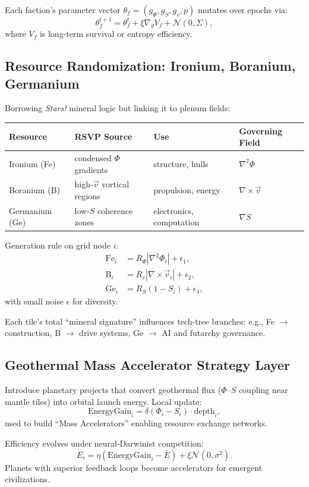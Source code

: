 \documentclass[12pt]{article}
\theoremstyle{definition}
\begin{document}
Each faction’s parameter vector $\theta_f = (g_\Phi, g_S, g_v, p)$ mutates over epochs via:
\[
\theta_f^{t+1} = \theta_f^t + \xi \nabla_\theta V_f + \mathcal{N}(0,\Sigma),
\]
where $V_f$ is long-term survival or entropy efficiency.

\subsection{Resource Randomization: Ironium, Boranium, Germanium}
Borrowing \emph{Stars!} mineral logic but linking it to plenum fields:

\begin{tabular}{llll}
\toprule
Resource & RSVP Source & Use & Governing Field \\
\midrule
Ironium (Fe) & condensed $\Phi$ gradients & structure, hulls & $\nabla^2 \Phi$ \\
Boranium (B) & high-$\vec{v}$ vortical regions & propulsion, energy & $\nabla \times \vec{v}$ \\
Germanium (Ge) & low-$S$ coherence zones & electronics, computation & $\nabla S$ \\
\bottomrule
\end{tabular}

Generation rule on grid node $i$:
\begin{align*}
\text{Fe}_i &= R_\Phi |\nabla^2 \Phi_i| + \epsilon_1, \\
\text{B}_i &= R_v |\nabla \times \vec{v}_i| + \epsilon_2, \\
\text{Ge}_i &= R_S (1 - S_i) + \epsilon_3,
\end{align*}
with small noise $\epsilon$ for diversity.

Each tile’s total “mineral signature” influences tech-tree branches: e.g., Fe $\to$ construction, B $\to$ drive systems, Ge $\to$ AI and futarchy governance.

\subsection{Geothermal Mass Accelerator Strategy Layer}
Introduce planetary projects that convert geothermal flux ($\Phi$–$S$ coupling near mantle tiles) into orbital launch energy. Local update:
\[
\text{EnergyGain}_i = \delta (\Phi_i - S_i) \cdot \text{depth}_i,
\]
used to build “Mass Accelerators” enabling resource exchange networks.

Efficiency evolves under neural-Darwinist competition:
\[
\dot{E}_i = \eta (\text{EnergyGain}_i - \bar{E}) + \xi \mathcal{N}(0, \sigma^2).
\]
Planets with superior feedback loops become accelerators for emergent civilizations.
\end{document}
